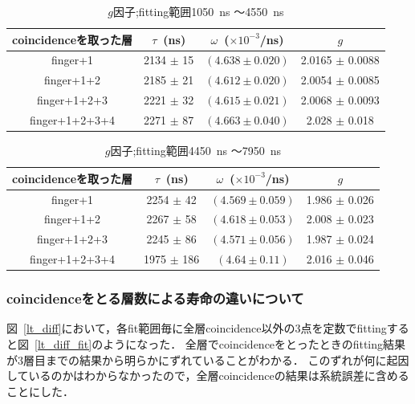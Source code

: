   \begin{table}[H]
    \caption{$g$因子;fitting範囲1050~ns 〜4550~ns }
    \label{fitrange3}
    \begin{center}
     \begin{tabular}{cccc}\toprule
      coincidenceを取った層&$\tau$~(ns)& $\omega$~($\times 10^{-3}$/ns) & $g$ \\ \midrule
      finger+1             &2134 $\pm$ 15 & $( 4.638 \pm 0.020 ) $ & 2.0165 $\pm$ 0.0088 \\
      finger+1+2 	  &2185 $\pm$ 21 & $( 4.612 \pm 0.020 ) $ & 2.0054 $\pm$ 0.0085 \\
      finger+1+2+3 	  &2221 $\pm$ 32 & $( 4.615 \pm 0.021 ) $ & 2.0068 $\pm$ 0.0093\\
      finger+1+2+3+4 	  &2271 $\pm$ 87 & $( 4.663 \pm 0.040 ) $ & 2.028 $\pm$ 0.018 \\ \bottomrule
     \end{tabular}
    \end{center}    
  \end{table}%

  \begin{table}[H]
   \caption{$g$因子;fitting範囲4450~ns 〜7950~ns }
   \label{fitrange4}
   \begin{center}
    \begin{tabular}{cccc}\toprule
     coincidenceを取った層&$\tau$~(ns)& $\omega$~($\times 10^{-3}$/ns) & $g$ \\ \midrule
     finger+1             &2254 $\pm$ 42 & $( 4.569 \pm 0.059 ) $ & 1.986 $\pm$ 0.026 \\
     finger+1+2 	  &2267 $\pm$ 58 & $( 4.618 \pm 0.053 ) $ & 2.008 $\pm$ 0.023 \\
     finger+1+2+3 	  &2245 $\pm$ 86 & $( 4.571 \pm 0.056 ) $ & 1.987 $\pm$ 0.024\\
     finger+1+2+3+4 	  &1975 $\pm$ 186& $( 4.64 \pm 0.11 ) $ & 2.016 $\pm$ 0.046 \\ \bottomrule
    \end{tabular}
   \end{center}
  \end{table}%

  \subsubsection{coincidenceをとる層数による寿命の違いについて}
  図~\ref{lt_diff}において，各fit範囲毎に全層coincidence以外の3点を定数でfittingすると図~\ref{lt_diff_fit}のようになった．
  全層でcoincidenceをとったときのfitting結果が3層目までの結果から明らかにずれていることがわかる．
  このずれが何に起因しているのかはわからなかったので，全層coincidenceの結果は系統誤差に含めることにした．

